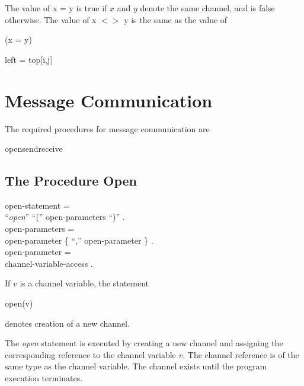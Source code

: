 The value of x = y is true if $x$ and $y$ denote the same
channel, and is false otherwise. The value of x $<>$ y is
the same as the value of

\begin{center}
  {\Not} (x = y)
\end{center}

\example

\begin{center}
  left = top[i,j]
\end{center}


\section{Message Communication}

The required procedures for message communication are

\begin{center}
  open{\blank}send{\blank}receive
\end{center}


\subsection{The Procedure Open}

\begin{grammar}
  {\GA}open-statement =                              \\
    {\GB}``{\it open}'' ``('' open-parameters ``)'' .\\
  {\GA}open-parameters =                             \\
    {\GB}open-parameter \{ ``,'' open-parameter \} . \\
  {\GA}open-parameter =                              \\
    {\GB}channel-variable-access .                   \\
\end{grammar}

If $v$ is a channel variable, the statement

\begin{center}
  open(v)
\end{center}

\noindent
denotes creation of a new channel.

The {\it open} statement is executed by creating a new
channel and assigning the corresponding reference to the
channel variable $v$. The channel reference is of the same
type as the channel variable. The channel exists until the
program execution terminates.

